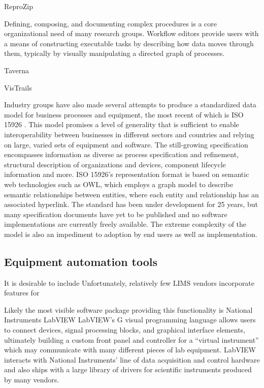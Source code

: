 \documentclass[../thesis]{subfiles}
\begin{document}
ReproZip

Defining, composing, and documenting complex procedures is a core
organizational need of many research groups. Workflow editors provide
users with a means of constructing executable tasks by describing how
data moves through them, typically by visually manipulating a directed
graph of processes.

Taverna

VisTrails

Industry groups have also made several attempts to produce a
standardized data model for business processes and equipment, the
most recent of which is ISO 15926 \cite{West2009}. This model promises
a level of generality that is sufficient to enable interoperability
between businesses in different sectors and countries and relying on
large, varied sets of equipment and software. The still-growing
specification encompasses information as diverse as process
specification and refinement, structural description of organizations
and devices, component lifecycle information and more. ISO 15926's
representation format is based on semantic web technologies such as OWL, which
employs a graph model to describe semantic relationships between
entities, where each entity and relationship has an associated
hyperlink. The standard has been under development for 25 years, but
many specification documents have yet to be published and no software
implementations are currently freely available. The extreme complexity
of the model is also an impediment to adoption by end users as well as
implementation.

\subsection{Equipment automation tools}

It is desirable to include
Unfortunately, relatively few LIMS vendors incorporate features for

Likely the most visible software package providing this functionality
is National Instruments LabVIEW \cite{ELLIOTT2007}
LabVIEW's G visual programming language allows users to connect
devices, signal processing blocks, and graphical interface elements,
ultimately building a custom front panel and controller for a
``virtual instrument'' which may communicate with many different
pieces of lab equipment. LabVIEW interacts with National Instruments'
line of data acquisition and control hardware and also ships with a
large library of drivers for scientific instruments produced by many
vendors.
\end{document}
